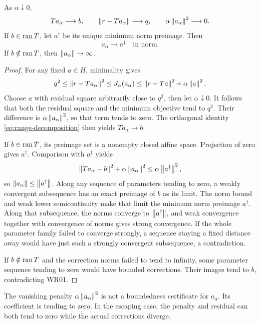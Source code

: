 \begin{theorem}\label{WR08}
As $\alpha\downarrow0$,
\[
 Ta_\alpha\longrightarrow b,\qquad
 \left\lVert r-Ta_\alpha\right\rVert\longrightarrow q,\qquad
 \alpha\left\lVert a_\alpha\right\rVert^2\longrightarrow0.
\]
If $b\in\operatorname{ran} T$, let $a^\dagger$ be its unique minimum norm preimage. Then
\[
 a_\alpha\longrightarrow a^\dagger\quad\text{in norm}.
\]
If $b\notin\operatorname{ran} T$, then $\left\lVert a_\alpha\right\rVert\to\infty$.
\end{theorem}
\begin{proof}
For any fixed $a\in H$, minimality gives
\[
 q^2\le\left\lVert r-Ta_\alpha\right\rVert^2
 \le J_\alpha(a_\alpha)\le\left\lVert r-Ta\right\rVert^2+\alpha\left\lVert a\right\rVert^2.
\]
Choose $a$ with residual square arbitrarily close to $q^2$, then let $\alpha\downarrow0$. It follows that both the residual square and the minimum objective tend to $q^2$. Their difference is $\alpha\left\lVert a_\alpha\right\rVert^2$, so that term tends to zero. The orthogonal identity \eqref{eq:range-decomposition} then yields $Ta_\alpha\to b$.

If $b\in\operatorname{ran} T$, its preimage set is a nonempty closed affine space. Projection of zero gives $a^\dagger$. Comparison with $a^\dagger$ yields
\[
 \left\lVert Ta_\alpha-b\right\rVert^2+\alpha\left\lVert a_\alpha\right\rVert^2
 \le\alpha\left\lVert a^\dagger\right\rVert^2,
\]
so $\left\lVert a_\alpha\right\rVert\le\left\lVert a^\dagger\right\rVert$. Along any sequence of parameters tending to zero, a weakly convergent subsequence has an exact preimage of $b$ as its limit. The norm bound and weak lower semicontinuity make that limit the minimum norm preimage $a^\dagger$. Along that subsequence, the norms converge to $\left\lVert a^\dagger\right\rVert$, and weak convergence together with convergence of norms gives strong convergence. If the whole parameter family failed to converge strongly, a sequence staying a fixed distance away would have just such a strongly convergent subsequence, a contradiction.

If $b\notin\operatorname{ran} T$ and the correction norms failed to tend to infinity, some parameter sequence tending to zero would have bounded corrections. Their images tend to $b$, contradicting WR01.
\end{proof}

The vanishing penalty $\alpha\left\lVert a_\alpha\right\rVert^2$ is not a boundedness certificate for $a_\alpha$. Its coefficient is tending to zero. In the escaping case, the penalty and residual can both tend to zero while the actual corrections diverge.

